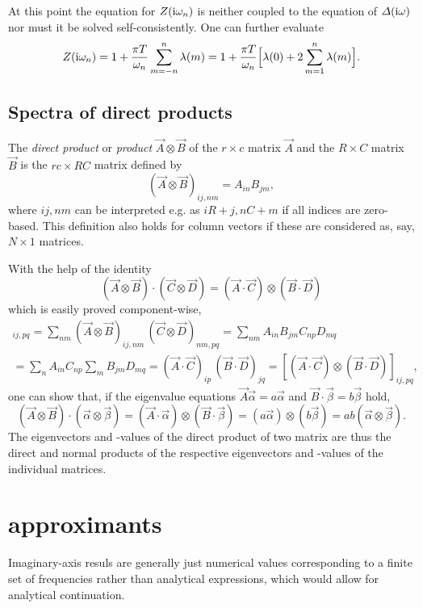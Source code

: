 At this point the equation for $Z(\mathrm i \omega_n)$ is neither coupled to the
equation of $\varDelta(\mathrm i \omega)$ nor must it be solved self-consistently. One can
further evaluate
%
\begin{equation} \label{normal-state renormalization}
    Z(\mathrm i \omega_n) = 1 + \frac{\pi T}{\omega_n} \sum_{m=-n}^n \lambda(m)
    = 1 + \frac{\pi T}{\omega_n}
    \Big[ \lambda(0) + 2 \sum_{m=1}^n \lambda(m) \Big].
\end{equation}

\subsection{Spectra of direct products}

The \emph{direct product} or \emph{ product} $\vec A \otimes
\vec B$ of the $r \times c$ matrix $\vec A$ and the $R \times C$ matrix $\vec B$
is the $r c \times R C$ matrix defined by
%
\begin{equation*}
    (\vec A \otimes \vec B)_{i j, n m} = A_{i n} B_{j m},
\end{equation*}
%
where $i j, n m$ can be interpreted e.g. as $i R + j, n C + m$ if all indices
are zero-based. This definition also holds for column vectors if these are
considered as, say, $N \times 1$ matrices.

With the help of the identity
%
\begin{equation*}
    (\vec A \otimes \vec B) \cdot (\vec C \otimes \vec D)
    = (\vec A \cdot \vec C) \otimes (\vec B \cdot \vec D)
\end{equation*}
%
which is easily proved component-wise,
%
\begin{multline*}
    [(\vec A \otimes \vec B) \cdot (\vec C \otimes \vec D)]_{i j, p q}
    = \sum_{n m}
        (\vec A \otimes \vec B)_{i j, n m} \,
        (\vec C \otimes \vec D)_{n m, p q}
    = \sum_{n m} A_{i n} B_{j m} C_{n p} D_{m q}
    \\
    = \sum_n A_{i n} C_{n p} \sum_m B_{j m} D_{m q}
    = (\vec A \cdot \vec C)_{i p} \, (\vec B \cdot \vec D)_{j q}
    = [(\vec A \cdot \vec C) \otimes (\vec B \cdot \vec D)]_{i j, p q},
\end{multline*}
%
one can show that, if the eigenvalue equations $\vec A \vec \alpha = a \vec
\alpha$ and $\vec B \cdot \vec \beta = b \vec \beta$ hold,
%
\begin{equation*}
    (\vec A \otimes \vec B) \cdot (\vec \alpha \otimes \vec \beta)
    = (\vec A \cdot \vec \alpha) \otimes (\vec B \cdot \vec \beta)
    = (a \vec \alpha) \otimes (b \vec \beta)
    = a b (\vec \alpha \otimes \vec \beta).
\end{equation*}
%
The eigenvectors and -values of the direct product of two matrix are thus the
direct and normal products of the respective eigenvectors and -values of the
individual matrices.

\section{ approximants}

Imaginary-axis resuls are generally just numerical values corresponding to a
finite set of  frequencies rather than analytical expressions,
which would allow for analytical continuation.
